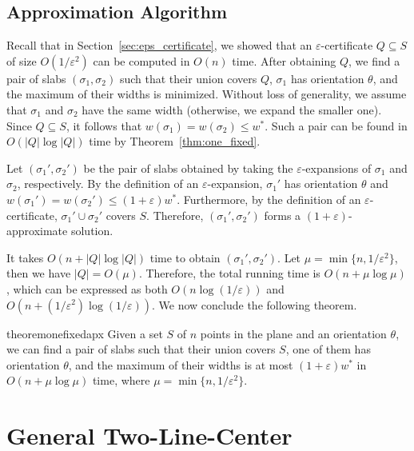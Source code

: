 \documentclass[10pt,a4paper]{article}
\theoremstyle{star}
\theoremstyle{claimstar}
\newcommand{\eps}{\ensuremath{\varepsilon}}
\begin{document}
\subsection{Approximation Algorithm}
\label{sec:one_fixed_approximation}

Recall that in Section~\ref{sec:eps_certificate}, we showed that an $\eps$-certificate $Q \subseteq S$ of size $O(1/\eps^2)$ can be computed in $O(n)$ time. 
After obtaining $Q$, we find a pair of slabs $(\sigma_1, \sigma_2)$ such that their union covers $Q$, $\sigma_1$ has orientation $\theta$, and the maximum of their widths is minimized.
Without loss of generality, we assume that $\sigma_1$ and $\sigma_2$ have the same width (otherwise, we expand the smaller one).
Since $Q \subseteq S$, it follows that $w(\sigma_1) = w(\sigma_2) \le w^*$. 
Such a pair can be found in $O(|Q|\log |Q|)$ time by Theorem~\ref{thm:one_fixed}. 

Let $(\sigma_1', \sigma_2')$ be the pair of slabs obtained by taking the $\eps$-expansions of $\sigma_1$ and $\sigma_2$, respectively. 
By the definition of an $\eps$-expansion, $\sigma_1'$ has orientation $\theta$ and $w(\sigma_1')= w(\sigma_2') \le (1+\eps)w^*$. 
Furthermore, by the definition of an $\eps$-certificate, $\sigma_1' \cup \sigma_2'$ covers $S$. 
Therefore, $(\sigma_1', \sigma_2')$ forms a $(1+\eps)$-approximate solution. 

It takes $O(n + |Q|\log |Q|)$ time to obtain $(\sigma_1', \sigma_2')$. 
Let $\mu = \min \{n, 1/\eps^2\}$, then we have $|Q| = O(\mu)$. 
Therefore, the total running time is $O(n + \mu \log \mu)$, which can be expressed as both $O(n \log (1/\eps))$ and $O(n + (1/\eps^2) \log (1/\eps))$. 
We now conclude the following theorem.




\begin{restatable}{theorem}{onefixedapx}
    \label{thm:one_fixed_apx}
    Given a set $S$ of $n$ points in the plane and an orientation $\theta$, we can find a pair of slabs such that their union covers $S$, one of them has orientation $\theta$, and the maximum of their widths is at most $(1+\eps)w^*$ in $O(n+ \mu\log \mu)$ time, where $\mu = \min \{n, 1/\eps^2\}$.  
\end{restatable}



\section{General Two-Line-Center}
\label{sec:general}
\end{document}
